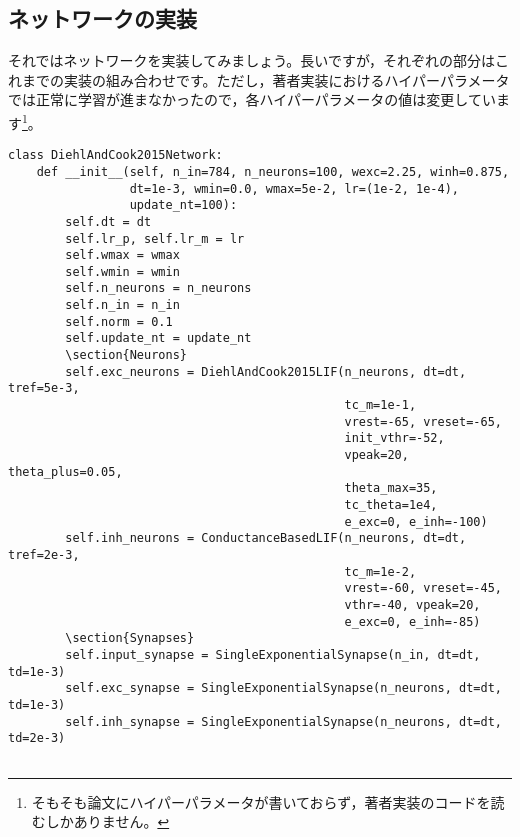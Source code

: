 \subsection{ネットワークの実装}
それではネットワークを実装してみましょう。長いですが，それぞれの部分はこれまでの実装の組み合わせです。ただし，著者実装におけるハイパーパラメータでは正常に学習が進まなかったので，各ハイパーパラメータの値は変更しています\footnote{そもそも論文にハイパーパラメータが書いておらず，著者実装のコードを読むしかありません。}。
\begin{verbatim}
class DiehlAndCook2015Network:
    def __init__(self, n_in=784, n_neurons=100, wexc=2.25, winh=0.875,
                 dt=1e-3, wmin=0.0, wmax=5e-2, lr=(1e-2, 1e-4),
                 update_nt=100):
        self.dt = dt
        self.lr_p, self.lr_m = lr
        self.wmax = wmax
        self.wmin = wmin
        self.n_neurons = n_neurons
        self.n_in = n_in
        self.norm = 0.1
        self.update_nt = update_nt
        \section{Neurons}
        self.exc_neurons = DiehlAndCook2015LIF(n_neurons, dt=dt, tref=5e-3,
                                               tc_m=1e-1,
                                               vrest=-65, vreset=-65, 
                                               init_vthr=-52,
                                               vpeak=20, theta_plus=0.05,
                                               theta_max=35,
                                               tc_theta=1e4,
                                               e_exc=0, e_inh=-100)
        self.inh_neurons = ConductanceBasedLIF(n_neurons, dt=dt, tref=2e-3,
                                               tc_m=1e-2,
                                               vrest=-60, vreset=-45,
                                               vthr=-40, vpeak=20,
                                               e_exc=0, e_inh=-85)
        \section{Synapses}
        self.input_synapse = SingleExponentialSynapse(n_in, dt=dt, td=1e-3)
        self.exc_synapse = SingleExponentialSynapse(n_neurons, dt=dt, td=1e-3)
        self.inh_synapse = SingleExponentialSynapse(n_neurons, dt=dt, td=2e-3)
        

\end{verbatim}
